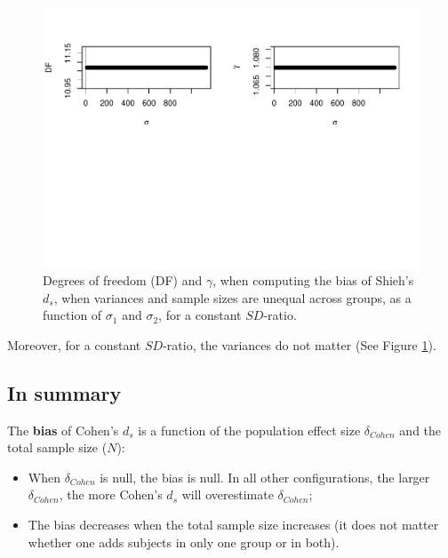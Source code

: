 \documentclass[
  english,
  man,mask]{apa6}
\providecommand{\tightlist}{%
  \setlength{\itemsep}{0pt}\setlength{\parskip}{0pt}}
\begin{document}
\begin{figure}
\centering
\includegraphics{Theoretical-Bias-of-all-estimators-as-a-function-of-population-parameters_files/figure-latex/biasshiehhetunbalvariance2-1.pdf}
\caption{\label{fig:biasshiehhetunbalvariance2}Degrees of freedom (DF) and \(\gamma\), when computing the bias of Shieh's \(d_s\), when variances and sample sizes are unequal across groups, as a function of \(\sigma_1\) and \(\sigma_2\), for a constant \(SD\)-ratio.}
\end{figure}

Moreover, for a constant \(SD\)-ratio, the variances do not matter (See Figure \ref{fig:biasshiehhetunbalvariance2}).

\hypertarget{in-summary}{%
\subsection{In summary}\label{in-summary}}

The \textbf{bias} of Cohen's \(d_s\) is a function of the population effect size \(\delta_{Cohen}\) and the total sample size (\(N\)):

\begin{itemize}
\tightlist
\item
  When \(\delta_{Cohen}\) is null, the bias is null. In all other configurations, the larger \(\delta_{Cohen}\), the more Cohen's \(d_s\) will overestimate \(\delta_{Cohen}\);\\
\item
  The bias decreases when the total sample size increases (it does not matter whether one adds subjects in only one group or in both).
\end{itemize}
\end{document}
